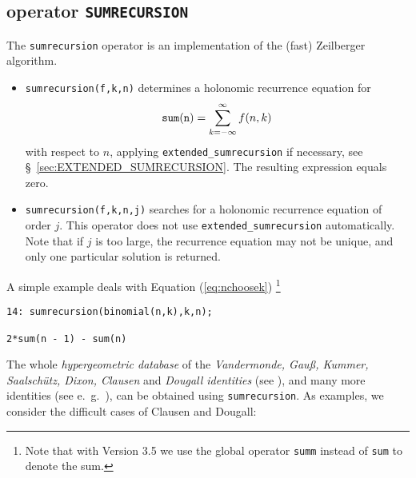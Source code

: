 \subsection{\REDUCE{} operator {\tt SUMRECURSION}}

The {\tt sumrecursion} operator is an implementation of the (fast)
Zeilberger algorithm.
\begin{itemize}
\item
{\tt sumrecursion(f,k,n)} determines a holonomic recurrence equation
for 
\[
{\tt sum(n)} =\sum\limits_{k=-\infty}^\infty f(n,k)
\]
with respect to $n$, applying
{\tt extended\verb+_+sumrecursion} if necessary, 
see \S~\ref{sec:EXTENDED_SUMRECURSION}.
The resulting expression equals zero.
\item
{\tt sumrecursion(f,k,n,j)} %
searches for a holonomic recurrence equation of order $j$. This 
operator does not use {\tt extended\verb+_+sumrecursion} automatically.
Note that if $j$ is too large, the recurrence equation
may not be unique, and only one particular solution is returned.
\end{itemize}
A simple example deals with Equation (\ref{eq:nchoosek})%
\footnote{Note that with \REDUCE{} Version 3.5 we use the global operator 
{\tt summ} instead of {\tt sum} to denote the sum.} 

{\small
\begin{verbatim}
14: sumrecursion(binomial(n,k),k,n);

2*sum(n - 1) - sum(n)
\end{verbatim}
}\noindent
The whole {\sl hypergeometric database} of the {\sl
Vandermonde, Gau{\ss}, Kummer, Saalsch\"utz, Dixon, Clausen} and {\sl Dougall
identities} (see \cite{Wilf}), and many more identities (see e.\ g.\
\cite{Koepf}), can be obtained using {\tt sumrecursion}. 
As examples, we consider the difficult cases of Clausen and Dougall:%

